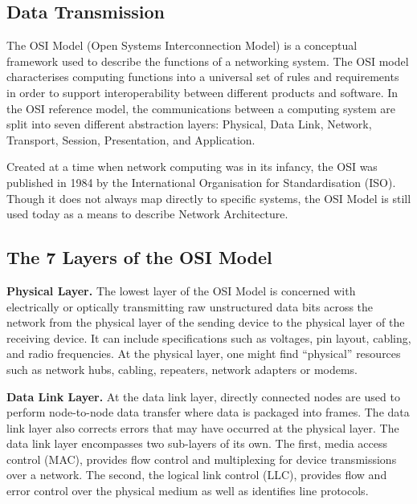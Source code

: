 \documentclass[../report.tex]{subfiles}
\begin{document}


\pagebreak

\subsection{Data Transmission} %

The OSI Model (Open Systems Interconnection Model) is a conceptual framework used to describe the functions of a networking system. The OSI model characterises computing functions into a universal set of rules and requirements in order to support interoperability between different products and software. In the OSI reference model, the communications between a computing system are split into seven different abstraction layers: Physical, Data Link, Network, Transport, Session, Presentation, and Application.

Created at a time when network computing was in its infancy, the OSI was published in 1984 by the International Organisation for Standardisation (ISO). Though it does not always map directly to specific systems, the OSI Model is still used today as a means to describe Network Architecture.

\subsection{The 7 Layers of the OSI Model}

\textbf{Physical Layer.} The lowest layer of the OSI Model is concerned with electrically or optically transmitting raw unstructured data bits across the network from the physical layer of the sending device to the physical layer of the receiving device. It can include specifications such as voltages, pin layout, cabling, and radio frequencies. At the physical layer, one might find “physical” resources such as network hubs, cabling, repeaters, network adapters or modems.

\textbf{Data Link Layer.} At the data link layer, directly connected nodes are used to perform node-to-node data transfer where data is packaged into frames. The data link layer also corrects errors that may have occurred at the physical layer. The data link layer encompasses two sub-layers of its own. The first, media access control (MAC), provides flow control and multiplexing for device transmissions over a network. The second, the logical link control (LLC), provides flow and error control over the physical medium as well as identifies line protocols.
\end{document}
